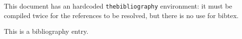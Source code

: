\documentclass{article}
\begin{document}
This document has an  hardcoded \verb+thebibliography+ environment: it
must be compiled  twice for the references \cite{key}  to be resolved,
but there is no use for bibtex.

\begin{thebibliography}{99}
 This is a bibliography entry.
\end{thebibliography}
\end{document}
